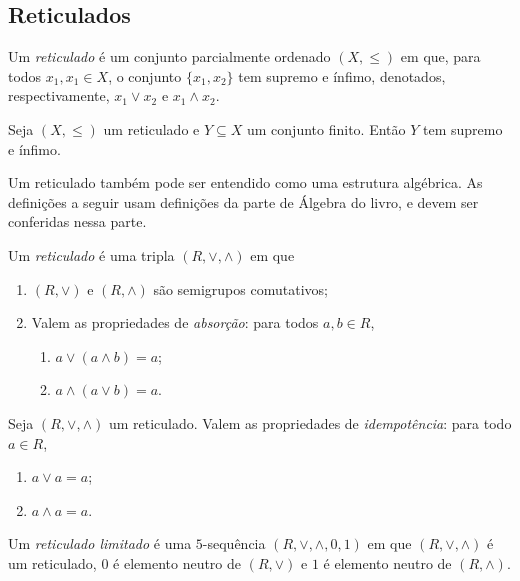 \subsection{Reticulados}

\begin{defi}
	Um \emph{reticulado} é um conjunto parcialmente ordenado $(X,\leq)$ em que, para todos $x_1, x_1 \in X$, o conjunto $\{x_1,x_2\}$ tem supremo e ínfimo, denotados, respectivamente, $x_1 \vee x_2$ e $x_1 \wedge x_2$.
\end{defi}

\begin{prop}
	Seja $(X,\leq)$ um reticulado e $Y \subseteq X$ um conjunto finito. Então $Y$ tem supremo e ínfimo.
\end{prop}

Um reticulado também pode ser entendido como uma estrutura algébrica. As definições a seguir usam definições da parte de Álgebra do livro, e devem ser conferidas nessa parte.

\begin{defi}
Um \emph{reticulado} é uma tripla $(R,\vee,\wedge)$ em que
	\begin{enumerate}
	\item $(R,\vee)$ e $(R,\wedge)$ são semigrupos comutativos;
	\item Valem as propriedades de \emph{absorção}: para todos $a,b \in R$, 
		\begin{enumerate}
		\item $a \vee (a \wedge b) = a$;
		\item $a \wedge (a \vee b) = a$.
		\end{enumerate}
	\end{enumerate}
\end{defi}

\begin{prop}
Seja $(R,\vee,\wedge)$ um reticulado. Valem as propriedades de \emph{idempotência}: para todo $a \in R$,
	\begin{enumerate}
	\item $a \vee a = a$;
	\item $a \wedge a = a$.
	\end{enumerate}
\end{prop}

\begin{defi}
Um \emph{reticulado limitado} é uma $5$-sequência $(R,\vee,\wedge,0,1)$ em que $(R,\vee,\wedge)$ é um reticulado, $0$ é elemento neutro de $(R,\vee)$ e $1$ é elemento neutro de $(R,\wedge)$.
\end{defi}

